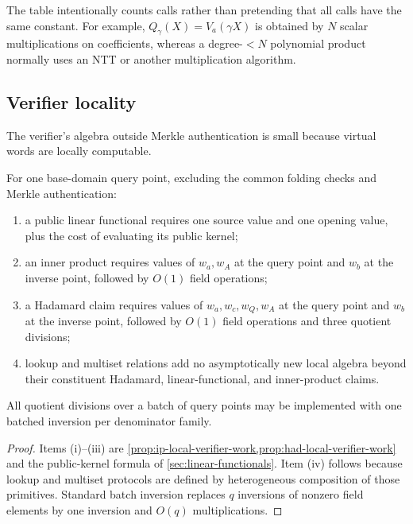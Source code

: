 The table intentionally counts calls rather than pretending that all calls have the same constant.  For example, $Q_\gamma(X)=V_a(\gamma X)$ is obtained by $N$ scalar multiplications on coefficients, whereas a degree-$<N$ polynomial product normally uses an NTT or another multiplication algorithm.

\subsection{Verifier locality}
\label{sec:complexity-verifier}

The verifier's algebra outside Merkle authentication is small because virtual words are locally computable.

\begin{proposition}
\label{prop:primitive-verifier-locality}
For one base-domain query point, excluding the common folding checks and Merkle authentication:
\begin{enumerate}[label=(\roman*),leftmargin=*]
  \item a public linear functional requires one source value and one opening value, plus the cost of evaluating its public kernel;
  \item an inner product requires values of $w_a,w_A$ at the query point and $w_b$ at the inverse point, followed by $O(1)$ field operations;
  \item a Hadamard claim requires values of $w_a,w_c,w_Q,w_A$ at the query point and $w_b$ at the inverse point, followed by $O(1)$ field operations and three quotient divisions;
  \item lookup and multiset relations add no asymptotically new local algebra beyond their constituent Hadamard, linear-functional, and inner-product claims.
\end{enumerate}
All quotient divisions over a batch of query points may be implemented with one batched inversion per denominator family.
\end{proposition}

\begin{proof}
Items (i)--(iii) are \cref{prop:ip-local-verifier-work,prop:had-local-verifier-work} and the public-kernel formula of \cref{sec:linear-functionals}.  Item (iv) follows because lookup and multiset protocols are defined by heterogeneous composition of those primitives.  Standard batch inversion replaces $q$ inversions of nonzero field elements by one inversion and $O(q)$ multiplications.
\end{proof}

